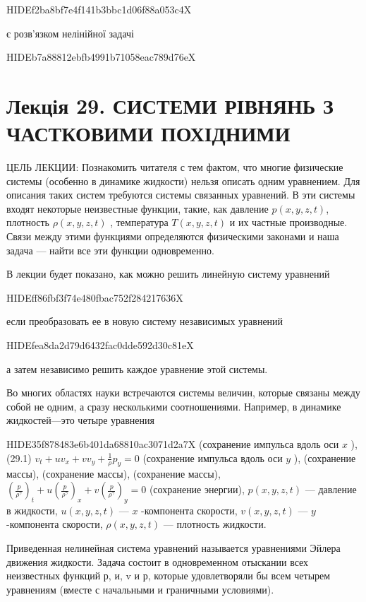 \documentclass[
  ukrainian,
]{article}
\begin{document}
HIDEf2ba8bf7e4f141b3bbc1d06f88a053c4X

є розв'язком нелінійної задачі

HIDEb7a88812ebfb4991b71058eac789d76eX

\section{Лекція 29. СИСТЕМИ РІВНЯНЬ З ЧАСТКОВИМИ
ПОХІДНИМИ}\label{ux43bux435ux43aux446ux456ux44f-29.-ux441ux438ux441ux442ux435ux43cux438-ux440ux456ux432ux43dux44fux43dux44c-ux437-ux447ux430ux441ux442ux43aux43eux432ux438ux43cux438-ux43fux43eux445ux456ux434ux43dux438ux43cux438}

ЦЕЛЬ ЛЕКЦИИ: Познакомить читателя с тем фактом, что многие физические
системы (особенно в динамике жидкости) нельзя описать одним уравнением.
Для описания таких систем требуются системы связанных уравнений. В эти
системы входят некоторые неизвестные функции, такие, как давление
\(p(x, y, z, t)\), плотность \(\rho(x, y, z, t)\) , температура
\(T(x, y, z, t)\) и их частные производные. Связи между этими функциями
определяются физическими законами и наша задача --- найти все эти
функции одновременно.

В лекции будет показано, как можно решить линейную систему уравнений

HIDEff86fbf3f74e480fbac752f284217636X

если преобразовать ее в новую систему независимых уравнений

HIDEfea8da2d79d6432fac0dde592d30c81eX

а затем независимо решить каждое уравнение этой системы.

Во многих областях науки встречаются системы величин, которые связаны
между собой не одним, а сразу несколькими соотношениями. Например, в
динамике жидкостей---это четыре уравнения

HIDE35f878483e6b401da68810ac3071d2a7X (сохранение импульса вдоль оси
\(x\) ), (29.1) \(v_t + uv_x + vv_y + \frac{1}{\rho} p_y = 0\)
(сохранение импульса вдоль оси \(y\) ), (сохранение массы), (сохранение
массы), (сохранение массы),
\(\left(\frac{p}{\rho^{\gamma}}\right)_t + u\left(\frac{p}{\rho^{\gamma}}\right)_x + v\left(\frac{p}{\rho^{\gamma}}\right)_y = 0\)
(сохранение энергии), \(p(x, y, z, t)\) --- давление в жидкости,
\(u(x, y, z, t)\) --- \(x\) -компонента скорости, \(v(x, y, z, t)\) ---
\(y\) -компонента скорости, \(\rho(x, y, z, t)\) --- плотность жидкости.

Приведенная нелинейная система уравнений называется уравнениями Эйлера
движения жидкости. Задача состоит в одновременном отыскании всех
неизвестных функций р, и, v и р, которые удовлетворяли бы всем четырем
уравнениям (вместе с начальными и граничными условиями).
\end{document}

